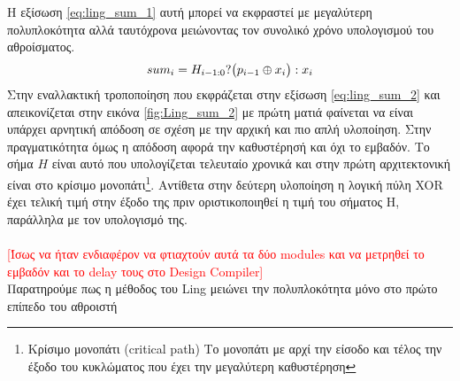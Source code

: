 Η εξίσωση \ref{eq:ling_sum_1} αυτή μπορεί να εκφραστεί με μεγαλύτερη πολυπλοκότητα 
αλλά ταυτόχρονα μειώνοντας τον συνολικό χρόνο υπολογισμού του αθροίσματος.
\begin{equation}
\label{eq:ling_sum_2}
\equationame{άθροισμα κατά Ling (2)}
    sum_i = H_{i-1:0} ? \big(p_{i-1} \oplus x_i\big) : x_i
\end{equation}
Στην εναλλακτική τροποποίηση που εκφράζεται στην εξίσωση \ref{eq:ling_sum_2} και 
απεικονίζεται στην εικόνα \ref{fig:Ling_sum_2} με πρώτη ματιά φαίνεται να είναι 
υπάρχει αρνητική απόδοση σε σχέση με την αρχική και πιο απλή υλοποίηση.
Στην πραγματικότητα όμως η απόδοση αφορά την καθυστέρησή και όχι το εμβαδόν. Το σήμα
$Η$ είναι αυτό που υπολογίζεται τελευταίο χρονικά και στην πρώτη αρχιτεκτονική
είναι στο κρίσιμο μονοπάτι\footnote{Κρίσιμο μονοπάτι (critical path) Το μονοπάτι με αρχί την είσοδο και τέλος την έξοδο του κυκλώματος που έχει την μεγαλύτερη καθυστέρηση}. Αντίθετα στην δεύτερη υλοποίηση η λογική πύλη XOR 
έχει τελική τιμή στην έξοδο της πριν οριστικοποιηθεί η τιμή του σήματος H, παράλληλα 
με τον υπολογισμό της. 
\\\\
 \textcolor{red}{[Ίσως να ήταν ενδιαφέρον να φτιαχτούν αυτά τα δύο modules και να μετρηθεί 
 το εμβαδόν και το delay τους στο Design Compiler]}
\\

 Παρατηρούμε πως η μέθοδος του Ling μειώνει την πολυπλοκότητα μόνο στο πρώτο επίπεδο 
 του αθροιστή
 
 
 
 
 
 
